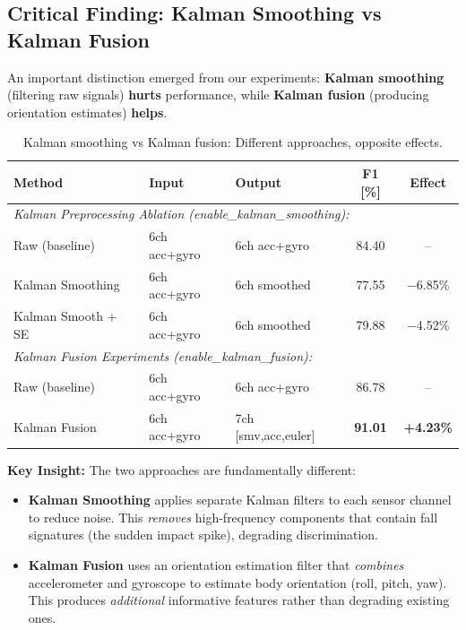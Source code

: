 \documentclass{article}
\begin{document}
\subsection{Critical Finding: Kalman Smoothing vs Kalman Fusion}

An important distinction emerged from our experiments: \textbf{Kalman smoothing} (filtering raw signals) \textbf{hurts} performance, while \textbf{Kalman fusion} (producing orientation estimates) \textbf{helps}.

\begin{table}[htbp]
    \centering
    \caption{Kalman smoothing vs Kalman fusion: Different approaches, opposite effects.}
    \label{tab:kalman_smoothing_vs_fusion}
    \begin{tabular}{lllcc}
        \toprule
        \textbf{Method} & \textbf{Input} & \textbf{Output} & \textbf{F1 [\%]} & \textbf{Effect} \\
        \midrule
        \multicolumn{5}{l}{\textit{Kalman Preprocessing Ablation (enable\_kalman\_smoothing):}} \\
        Raw (baseline) & 6ch acc+gyro & 6ch acc+gyro & 84.40 & -- \\
        Kalman Smoothing & 6ch acc+gyro & 6ch smoothed & 77.55 & $-$6.85\% \\
        Kalman Smooth + SE & 6ch acc+gyro & 6ch smoothed & 79.88 & $-$4.52\% \\
        \midrule
        \multicolumn{5}{l}{\textit{Kalman Fusion Experiments (enable\_kalman\_fusion):}} \\
        Raw (baseline) & 6ch acc+gyro & 6ch acc+gyro & 86.78 & -- \\
        Kalman Fusion & 6ch acc+gyro & 7ch [smv,acc,euler] & \textbf{91.01} & \textbf{+4.23\%} \\
        \bottomrule
    \end{tabular}
\end{table}

\textbf{Key Insight:} The two approaches are fundamentally different:
\begin{itemize}
    \item \textbf{Kalman Smoothing} applies separate Kalman filters to each sensor channel to reduce noise. This \textit{removes} high-frequency components that contain fall signatures (the sudden impact spike), degrading discrimination.

    \item \textbf{Kalman Fusion} uses an orientation estimation filter that \textit{combines} accelerometer and gyroscope to estimate body orientation (roll, pitch, yaw). This produces \textit{additional} informative features rather than degrading existing ones.
\end{itemize}
\end{document}
